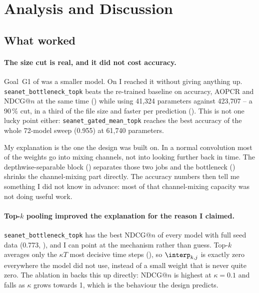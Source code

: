 %

\section{Analysis and Discussion}
\label{sec:discussion}

\subsection{What worked}
\label{sec:disc:worked}

\paragraph{The size cut is real, and it did not cost accuracy.}
Goal~G1 of  was a smaller model. On \webtraffic{} I reached it without giving
anything up. \texttt{seanet\_bottleneck\_topk} beats the re-trained \millet{} baseline on accuracy,
AOPCR and NDCG@$n$ at the same time () while using 41{,}324 parameters against
423{,}707 -- a 90\,\% cut, in a third of the file size and faster per prediction
(). This is not one lucky
point either: \texttt{seanet\_gated\_mean\_topk} reaches the best accuracy of the whole 72-model
sweep (0.955) at 61{,}740 parameters.

My explanation is the one the design was built on. In a normal convolution most of the weights go
into mixing channels, not into looking further back in time. The depthwise-separable block
() separates those two jobs and the bottleneck () shrinks
the channel-mixing part directly. The accuracy numbers then tell me something I did not know in
advance: most of that channel-mixing capacity was not doing useful work.

\paragraph{Top-$k$ pooling improved the explanation for the reason I claimed.}
\texttt{seanet\_bottleneck\_topk} has the best NDCG@$n$ of every model with full seed data
(0.773, ), and I can point at the mechanism rather than guess.
Top-$k$ averages only the $\kappa T$ most decisive time steps (), so
$\interp_{k,j}$ is exactly zero everywhere the model did not use, instead of a small weight that is
never quite zero. The ablation in  backs this up directly: NDCG@$n$ is highest
at $\kappa = 0.1$ and falls as $\kappa$ grows towards 1, which is the behaviour the design
predicts.

